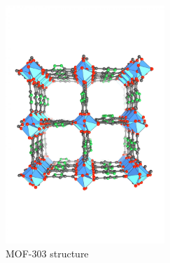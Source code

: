 \documentclass[../Master.tex]{subfiles}
\begin{document}
\begin{figure}[h!]
	\centering
	\includegraphics[width=6cm,keepaspectratio]{Images/MOF303.jpeg}
	\caption{MOF-303 structure}\label{fig:mof303structure}
\end{figure}
\end{document}
